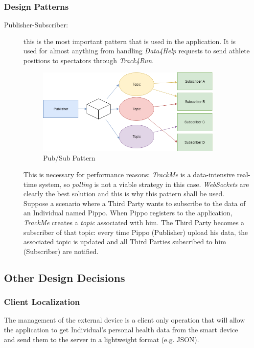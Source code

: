 \documentclass[a4paper]{article}
\begin{document}
    \subsubsection{Design Patterns}
    \begin{description}
    \item[Publisher-Subscriber:] this is the most important pattern that is used in the application. It is used for almost anything from handling \textit{Data4Help} requests to send athlete positions to spectators through \textit{Track4Run}.
    \begin{figure}[!hb]
        \centering
        \includegraphics[width=0.9\textwidth,keepaspectratio]{DD/images/pubsub.png}
        \caption{Pub/Sub Pattern}
        \label{fig:pubsub}
    \end{figure}
    
    This is necessary for performance reasons: \textit{TrackMe} is a data-intensive real-time system, so \textit{polling} is not a viable strategy in this case.
    \textit{WebSockets} are clearly the best solution and this is why this pattern shall be used.\\
    Suppose a scenario where a Third Party wants to subscribe to the data of an Individual named Pippo. When Pippo registers to the application, \textit{TrackMe} creates a \textit{topic} associated with him. The Third Party becomes a subscriber of that topic: every time Pippo (Publisher) upload his data, the associated topic is updated and all Third Parties subscribed to him (Subscriber) are notified.
    \end{description}

\subsection{Other Design Decisions}
\subsubsection{Client Localization}
The management of the external device is a client only operation that will allow the application to get Individual's personal health data from the smart device and send them to the server in a lightweight format (e.g. JSON).\\ 
\end{document}
